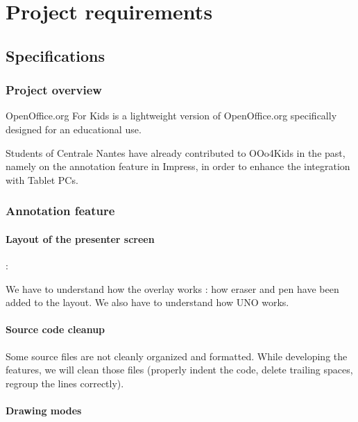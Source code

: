 \documentclass[a4paper,11pt]{article}
\begin{document}
\newpage

\fancyfoot[C]{\thepage}
\section*{Project requirements}

\subsection*{Specifications}


\subsubsection*{Project overview}

OpenOffice.org For Kids is a lightweight version of OpenOffice.org specifically designed for an educational use.

Students of Centrale Nantes have already contributed to OOo4Kids in the past, namely on the annotation feature in Impress, in order to enhance the integration with Tablet PCs.


\subsubsection*{Annotation feature}


\paragraph*{Layout of the presenter screen} :

We have to understand how the overlay works : how eraser and pen have been added to the layout. We also have to understand how UNO works.



\paragraph*{Source code cleanup}

Some source files are not cleanly organized and formatted. While developing the features, we will clean those files (properly indent the code, delete trailing spaces, regroup the lines correctly).


\paragraph*{Drawing modes}
\end{document}
